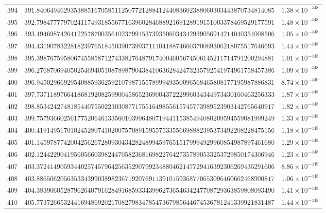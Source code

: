 \documentclass[12pt,reqno]{amsart}
\theoremstyle{remark}
\begin{document}
\begin{longtable}{clc}
$394$ & $391.8406494629353885167058511250772128841244083602388060303443870734814085$ & $1.38\times 10^{-448}$ \\
$395$ & $392.7984777797024117493185567716396028468892169128919151003378469529177591$ & $1.48\times 10^{-448}$ \\
$396$ & $393.4946987426412257870035610237991537393506034342939056914214040354008506$ & $1.05\times 10^{-448}$ \\
$397$ & $394.4319078322818239765184503907399371110418874660370069306218075517646693$ & $1.44\times 10^{-448}$ \\
$398$ & $395.3987675958067455858712743382764879174004605674506145211714791200294881$ & $1.01\times 10^{-448}$ \\
$399$ & $396.2768706940502546940510878987904384106362842473235792541974961758457386$ & $1.09\times 10^{-448}$ \\
$400$ & $396.9450296692954088593625921079871557899949350096568465808177195987886831$ & $8.74\times 10^{-449}$ \\
$401$ & $397.7371189766418681920825990045865236900437222996034344973430160463256333$ & $1.87\times 10^{-448}$ \\
$402$ & $398.8534242748185440755022303087717551649855615745773989523903142765640917$ & $1.82\times 10^{-448}$ \\
$403$ & $399.7579366025617752064613356010399648071944115385494080209594559081999249$ & $1.33\times 10^{-448}$ \\
$404$ & $400.4191495170102452807410200757089159557533556698882395373492208228475156$ & $1.18\times 10^{-448}$ \\
$405$ & $401.1459787742004256267280930434282489945976515179994929960854987897461680$ & $1.29\times 10^{-448}$ \\
$406$ & $402.1244229041956056603982447058236816982276427357890533253729850174306946$ & $1.23\times 10^{-448}$ \\
$407$ & $403.3724149059344025745796425635290799234880462147729416392306269435291606$ & $8.86\times 10^{-449}$ \\
$408$ & $403.8865062056353343990389823671920769113910159368770653096460662468900817$ & $1.06\times 10^{-448}$ \\
$409$ & $404.3839060528796264079162849168593343996273654634247708729363859808093490$ & $1.41\times 10^{-448}$ \\
$410$ & $405.7737266532441694869202170827983478547367985644674536781241339921831487$ & $1.44\times 10^{-448}$ \\

\end{longtable}
\end{document}
